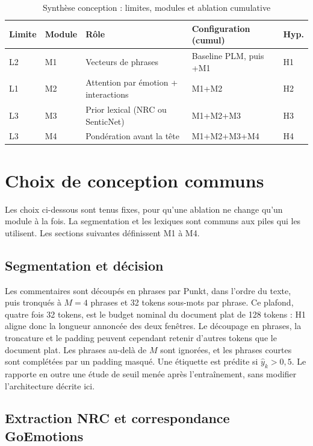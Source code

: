 \begin{table}[H]
\centering
\caption{Synthèse conception : limites, modules et ablation cumulative}
\label{tab:conception-ablation}
\renewcommand{\arraystretch}{1.25}
\begin{tabular}{|p{1.4cm}|p{2.2cm}|p{3.2cm}|p{4.2cm}|p{2.4cm}|}
\hline
\textbf{Limite} & \textbf{Module} & \textbf{Rôle} & \textbf{Configuration (cumul)} & \textbf{Hyp.} \\
\hline
L2 & M1 & Vecteurs de phrases & Baseline PLM, puis +M1 & H1 \\
\hline
L1 & M2 & Attention par émotion + interactions & M1+M2 & H2 \\
\hline
L3 & M3 & Prior lexical (NRC ou SenticNet) & M1+M2+M3 & H3 \\
\hline
L3 & M4 & Pondération avant la tête & M1+M2+M3+M4 & H4 \\
\hline
\end{tabular}
\end{table}

\section{Choix de conception communs}
\label{sec:conception-choix}

Les choix ci-dessous sont tenus fixes, pour qu'une ablation ne change
qu'un module à la fois. La segmentation et les lexiques sont communs
aux piles qui les utilisent. Les sections suivantes définissent M1 à M4.

\subsection{Segmentation et décision}

Les commentaires sont découpés en phrases par Punkt, dans l'ordre du
texte, puis tronqués à $M{=}4$ phrases et 32 tokens sous-mots par phrase.
Ce plafond, quatre fois 32 tokens, est le budget nominal du document
plat de 128 tokens : H1 aligne donc la longueur annoncée des deux
fenêtres. Le découpage en phrases, la troncature et le padding peuvent
cependant retenir d'autres tokens que le document plat. Les phrases
au-delà de $M$ sont ignorées, et les phrases courtes sont complétées par
un padding masqué. Une étiquette est prédite si $\hat{y}_k > 0{,}5$. Le
 rapporte en outre une étude de seuil menée
après l'entraînement, sans modifier l'architecture décrite ici.

\subsection{Extraction NRC et correspondance GoEmotions}

